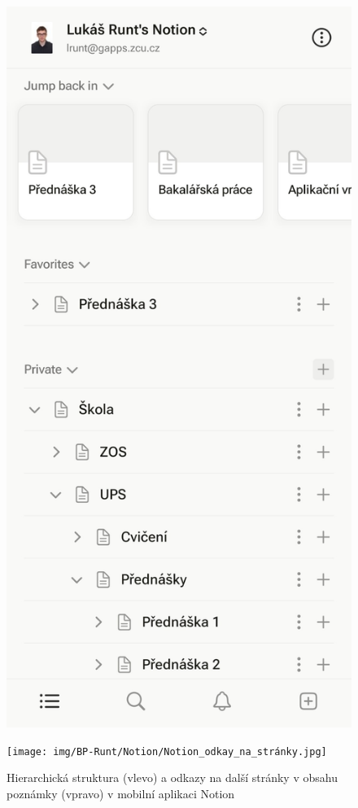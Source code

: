 \documentclass[czech, bc, kiv, he, iso690numb]{fasthesis}
\begin{document}
\begin{figure}[h!]
  \centering
  \begin{minipage}[h]{0.3\textwidth}
    \includegraphics[width=\textwidth]{img/BP-Runt/Notion/Notion_hierarchie.jpg}
  \end{minipage}
  \hspace{30pt}
  \begin{minipage}[h]{0.3\textwidth}
    \texttt{[image: img/BP-Runt/Notion/Notion\_odkay\_na\_stránky.jpg]}
  \end{minipage}
  \caption{Hierarchická struktura (vlevo) a odkazy na další stránky v obsahu poznámky (vpravo) v mobilní aplikaci Notion}
  \label{fig:hierarchie_Notion}
\end{figure}
\end{document}
